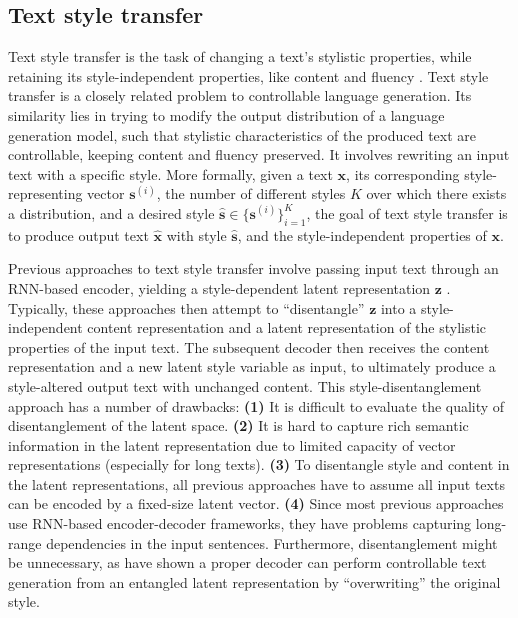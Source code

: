 \subsection{Text style transfer}
Text style transfer is the task of changing a text's stylistic properties, while retaining its style-independent properties, like content and fluency \citep{dai2019style}. Text style transfer is a closely related problem to controllable language generation. Its similarity lies in trying to modify the output distribution of a language generation model, such that stylistic characteristics of the produced text are controllable, keeping content and fluency preserved. It involves rewriting an input text with a specific style. More formally, given a text $\textbf{x}$, its corresponding style-representing vector $\textbf{s}^{(i)}$, the number of different styles $K$ over which there exists a distribution, and a desired style $\hat{\textbf{s}} \in \{\textbf{s}^{(i)}\}_{i = 1}^{K}$, the goal of text style transfer is to produce output text $\hat{\textbf{x}}$ with style $\hat{\textbf{s}}$, and the style-independent properties of $\textbf{x}$. 

Previous approaches to text style transfer involve passing input text through an RNN-based encoder, yielding a style-dependent latent representation $\textbf{z}$ \citep{zhang2018styletranslation}. Typically, these approaches then attempt to ``disentangle'' $\textbf{z}$ into a style-independent content representation and a latent representation of the stylistic properties of the input text. The subsequent decoder then receives the content representation and a new latent style variable as input, to ultimately produce a style-altered output text with unchanged content. This style-disentanglement approach has a number of drawbacks: \textbf{(1)} It is difficult to evaluate the quality of disentanglement of the latent space. \textbf{(2)} It is hard to capture rich semantic information in the latent representation due to limited capacity of vector representations (especially for long texts). \textbf{(3)} To disentangle style and content in the latent representations, all previous approaches have to assume all input texts can be encoded by a fixed-size latent vector. \textbf{(4)} Since most previous approaches use RNN-based encoder-decoder frameworks, they have problems capturing long-range dependencies in the input sentences. Furthermore, disentanglement might be unnecessary, as \cite{lample2018multipleattribute} have shown a proper decoder can perform controllable text generation from an entangled latent representation by ``overwriting'' the original style.

